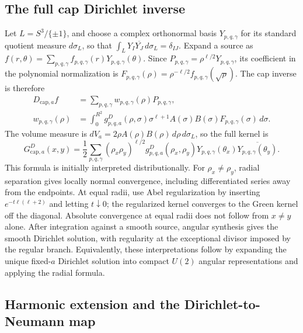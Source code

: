 \documentclass[11pt,a4paper,twoside]{article}
\numberwithin{equation}{section}
\theoremstyle{definition}
\theoremstyle{remark}
\begin{document}
\subsection{The full cap Dirichlet inverse}

Let \(L=S^3/\{\pm1\}\), and choose a complex orthonormal basis
\(Y_{p,q,\gamma}\) for its standard quotient measure \(d\sigma_L\),
so that \(\int_LY_I\overline{Y_J}\,d\sigma_L=\delta_{IJ}\).
Expand a source as
\(f(r,\theta)=\sum_{p,q,\gamma}f_{p,q,\gamma}(r)
Y_{p,q,\gamma}(\theta)\).
Since \(P_{p,q,\gamma}=\rho^{\ell/2}Y_{p,q,\gamma}\), its coefficient
in the polynomial normalization is
\(F_{p,q,\gamma}(\rho)
=\rho^{-\ell/2}f_{p,q,\gamma}(\sqrt\rho)\).
The cap inverse is therefore
\begin{equation}\label{app:eq:Dcap}
\begin{aligned}
D_{\mathrm{cap},a}f
&=\sum_{p,q,\gamma}w_{p,q,\gamma}(\rho)P_{p,q,\gamma},\\
w_{p,q,\gamma}(\rho)
&=\int_0^{R^2}g_{p,q,a}^{D}(\rho,\sigma)
\sigma^{\ell+1}A(\sigma)B(\sigma)F_{p,q,\gamma}(\sigma)\,d\sigma.
\end{aligned}
\end{equation}
The volume measure is
\(dV_a=2\rho A(\rho)B(\rho)\,d\rho\,d\sigma_L\), so the full kernel is
\[
G_{\mathrm{cap},a}^{D}(x,y)
=\frac12\sum_{p,q,\gamma}
(\rho_x\rho_y)^{\ell/2}g_{p,q,a}^{D}(\rho_x,\rho_y)
Y_{p,q,\gamma}(\theta_x)\overline{Y_{p,q,\gamma}(\theta_y)}.
\]
This formula is initially interpreted distributionally. For
\(\rho_x\ne\rho_y\), radial separation gives locally normal
convergence, including differentiated series away from the endpoints.
At equal radii, use Abel regularization by inserting
\(e^{-t\ell(\ell+2)}\) and letting \(t\downarrow0\); the regularized
kernel converges to the Green kernel off the diagonal. Absolute
convergence at equal radii does not follow from \(x\ne y\) alone.
After integration against a smooth source, angular synthesis gives
the smooth Dirichlet solution, with regularity at the exceptional
divisor imposed by the regular branch. Equivalently, these
interpretations follow by expanding the unique fixed-\(a\) Dirichlet
solution into compact \(U(2)\) angular representations and applying
the radial formula.

\subsection{Harmonic extension and the Dirichlet-to-Neumann map}
\end{document}
